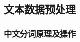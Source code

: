 \documentclass[cs4size,a4paper]{ctexart}
\numberwithin{equation}{section}
\numberwithin{table}{section}
\numberwithin{figure}{section}
\begin{document}

\subsection{文本数据预处理}


\subsubsection{中文分词原理及操作}




\end{document}
